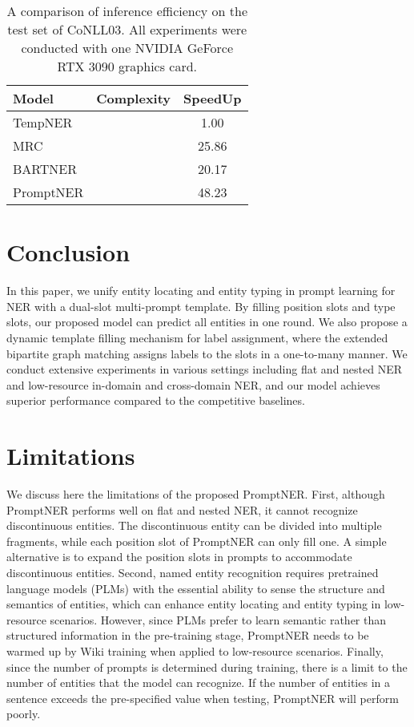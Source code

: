 \documentclass[11pt]{article}
\begin{document}
\begin{table}[!htp]
    \centering
    \small
    \begin{tabular}{lcc}
    \toprule
    Model & Complexity & SpeedUp \\
    \midrule
     {TempNER \citep{cui-etal-2021-template}} &  & 1.00 \\ {MRC \citep{li-etal-2020-unified}}  &  & 25.86  \\  {BARTNER \citep{yan-etal-2021-unified-generative}} &   &  20.17 \\  

     \midrule
     PromptNER &  & 48.23  \\  \bottomrule
    \end{tabular}
    \caption{A comparison of inference efficiency on the test set of CoNLL03. All experiments were conducted with one NVIDIA GeForce RTX 3090 graphics card.}
    \label{tab:inference}
\end{table}


\section{Conclusion}

In this paper, we unify entity locating and entity typing in prompt learning for NER with a dual-slot multi-prompt template. By filling position slots and type slots, our proposed model can predict all entities in one round. We also propose a dynamic template filling mechanism for label assignment, where the extended bipartite graph matching assigns labels to the slots in a one-to-many manner. We conduct extensive experiments in various settings including flat and nested NER and low-resource in-domain and cross-domain NER, and our model achieves superior performance compared to the competitive baselines. 

\section*{Limitations}

We discuss here the limitations of the proposed PromptNER. First, although PromptNER performs well on flat and nested NER, it cannot recognize discontinuous entities. The discontinuous entity can be divided into multiple fragments, while each position slot of PromptNER can only fill one. A simple alternative is to expand the position slots in prompts to accommodate discontinuous entities. Second, named entity recognition requires pretrained language models (PLMs) with the essential ability to sense the structure and semantics of entities, which can enhance entity locating and entity typing in low-resource scenarios. However, since PLMs prefer to learn semantic rather than structured information in the pre-training stage, PromptNER needs to be warmed up by Wiki training when applied to low-resource scenarios. Finally, since the number of prompts is determined during training, there is a limit to the number of entities that the model can recognize. If the number of entities in a sentence exceeds the pre-specified value when testing, PromptNER will perform poorly.
\end{document}
